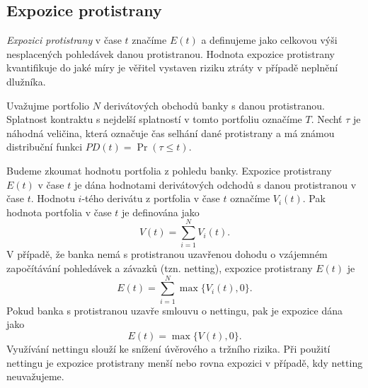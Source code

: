 \documentclass[a4paper,12pt]{report}
\theoremstyle{definition} \newtheorem{definice}[veta]{Definice}
\theoremstyle{remark}
\begin{document}
%

\subsection{Expozice protistrany}
\textit{Expozici protistrany} v čase $t$ značíme $E(t)$ a definujeme jako celkovou výši nesplacených pohledávek danou protistranou.
Hodnota expozice protistrany kvantifikuje do jaké míry je věřitel vystaven riziku ztráty v případě neplnění dlužníka.

Uvažujme portfolio $N$ derivátových obchodů banky s danou protistranou.
Splatnost kontraktu s nejdelší splatností v tomto portfoliu označíme $T$. 
Nechť $\tau$ je náhodná veličina, která označuje čas selhání dané protistrany a má známou distribuční funkci $PD(t)=\Pr(\tau\leq t)$.

Budeme zkoumat hodnotu portfolia z pohledu banky.
Expozice protistrany $E(t)$ v čase $t$ je dána hodnotami derivátových odchodů s danou protistranou v čase $t$.
Hodnotu $i$-tého derivátu z portfolia v čase $t$  označíme $V_i(t)$.
Pak hodnota portfolia v čase $t$ je definována jako
\begin{equation}
V(t)=\sum_{i=1}^N V_i(t).
\end{equation}
V případě, že banka nemá s protistranou uzavřenou dohodu o vzájemném započítávání pohledávek a závazků (tzn. netting), expozice protistrany $E(t)$ je 
\begin{equation}
E(t)=\sum_{i=1}^N\max\{V_i(t),0\}.
\end{equation}
Pokud banka s protistranou uzavře smlouvu o nettingu, pak je expozice dána jako
\begin{equation}
E(t)=\max\{V(t),0\}.
\end{equation}
Využívání nettingu slouží ke snížení úvěrového a tržního rizika. 
Při použití nettingu je expozice protistrany menší nebo rovna expozici v případě, kdy netting neuvažujeme. 
\end{document}
